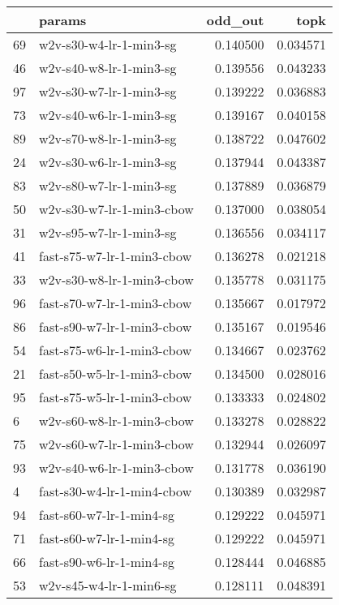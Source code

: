 \begin{tabular}{llrr}
\toprule
{} &                       params &   odd\_out &      topk \\
\midrule
69 &      w2v-s30-w4-lr-1-min3-sg &  0.140500 &  0.034571 \\
46 &      w2v-s40-w8-lr-1-min3-sg &  0.139556 &  0.043233 \\
97 &      w2v-s30-w7-lr-1-min3-sg &  0.139222 &  0.036883 \\
73 &      w2v-s40-w6-lr-1-min3-sg &  0.139167 &  0.040158 \\
89 &      w2v-s70-w8-lr-1-min3-sg &  0.138722 &  0.047602 \\
24 &      w2v-s30-w6-lr-1-min3-sg &  0.137944 &  0.043387 \\
83 &      w2v-s80-w7-lr-1-min3-sg &  0.137889 &  0.036879 \\
50 &    w2v-s30-w7-lr-1-min3-cbow &  0.137000 &  0.038054 \\
31 &      w2v-s95-w7-lr-1-min3-sg &  0.136556 &  0.034117 \\
41 &   fast-s75-w7-lr-1-min3-cbow &  0.136278 &  0.021218 \\
33 &    w2v-s30-w8-lr-1-min3-cbow &  0.135778 &  0.031175 \\
96 &   fast-s70-w7-lr-1-min3-cbow &  0.135667 &  0.017972 \\
86 &   fast-s90-w7-lr-1-min3-cbow &  0.135167 &  0.019546 \\
54 &   fast-s75-w6-lr-1-min3-cbow &  0.134667 &  0.023762 \\
21 &   fast-s50-w5-lr-1-min3-cbow &  0.134500 &  0.028016 \\
95 &   fast-s75-w5-lr-1-min3-cbow &  0.133333 &  0.024802 \\
6  &    w2v-s60-w8-lr-1-min3-cbow &  0.133278 &  0.028822 \\
75 &    w2v-s60-w7-lr-1-min3-cbow &  0.132944 &  0.026097 \\
93 &    w2v-s40-w6-lr-1-min3-cbow &  0.131778 &  0.036190 \\
4  &   fast-s30-w4-lr-1-min4-cbow &  0.130389 &  0.032987 \\
94 &     fast-s60-w7-lr-1-min4-sg &  0.129222 &  0.045971 \\
71 &     fast-s60-w7-lr-1-min4-sg &  0.129222 &  0.045971 \\
66 &     fast-s90-w6-lr-1-min4-sg &  0.128444 &  0.046885 \\
53 &      w2v-s45-w4-lr-1-min6-sg &  0.128111 &  0.048391 \\

\end{tabular}

